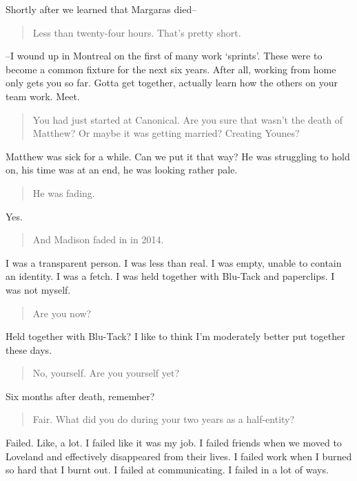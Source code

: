 Shortly after we learned that Margaras died--

\begin{quote}
Less than twenty-four hours. That's pretty short.
\end{quote}

--I wound up in Montreal on the first of many work `sprints'. These were to become a common fixture for the next six years. After all, working from home only gets you so far. Gotta get together, actually learn how the others on your team work. Meet.

\begin{quote}
You had just started at Canonical. Are you sure that wasn't the death of Matthew? Or maybe it was getting married? Creating Younes?
\end{quote}

Matthew was sick for a while. Can we put it that way? He was struggling to hold on, his time was at an end, he was looking rather pale.

\begin{quote}
He was fading.
\end{quote}

Yes.

\begin{quote}
And Madison faded in in 2014.
\end{quote}

I was a transparent person. I was less than real. I was empty, unable to contain an identity. I was a fetch. I was held together with Blu-Tack and paperclips. I was not myself.

\begin{quote}
Are you now?
\end{quote}

Held together with Blu-Tack? I like to think I'm moderately better put together these days.

\begin{quote}
No, yourself. Are you yourself yet?
\end{quote}

Six months after death, remember?

\begin{quote}
Fair. What did you do during your two years as a half-entity?
\end{quote}

Failed. Like, a lot. I failed like it was my job. I failed friends when we moved to Loveland and effectively disappeared from their lives. I failed work when I burned so hard that I burnt out. I failed at communicating. I failed in a lot of ways.

